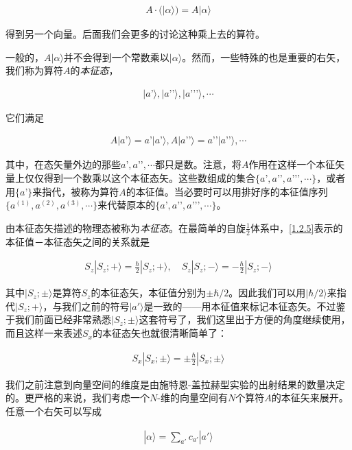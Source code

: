 \documentclass[UTF8,twoside]{ctexart}
\begin{document}
\begin{align}
A\cdot(|\alpha\rangle) = A|\alpha\rangle
\end{align}

\noindent 得到另一个向量。后面我们会更多的讨论这种乘上去的算符。

一般的，$A|\alpha\rangle$并不会得到一个常数乘以$|\alpha\rangle$。然而，一些特殊的也是重要的右矢，我们称为算符$A$的{\emph{本征态}}，

\begin{align}
|a’\rangle,|a’’\rangle,|a’’’\rangle,\cdots
\end{align}

\noindent 它们满足

\begin{align}\label{1.2.5}
A|a’\rangle = a’|a’\rangle,A|a’’\rangle = a’’|a’’\rangle,\cdots
\end{align}

其中，在态矢量外边的那些$a’, a’’,\cdots$都只是数。注意，将$A$作用在这样一个本征矢量上仅仅得到一个数乘以这个本征态矢。这些数组成的集合$\{a’,a’’,a’’’,\cdots\}$，或者用$\{a’\}$来指代，被称为算符$A$的本征值。当必要时可以用排好序的本征值序列$\{a^{(1)},a^{(2)},a^{(3)},\cdots\}$来代替原本的$\{a’,a’’,a’’’,\cdots\}$。

由本征态矢描述的物理态被称为{\emph{本征态}}。在最简单的自旋$\frac{1}{2}$体系中，\eqref{1.2.5}表示的本征值－本征态矢之间的关系就是

\begin{align}
S_z|S_z;+\rangle = \frac{\hbar}{2}|S_z;+\rangle,\quad S_z|S_z;-\rangle = -\frac{\hbar}{2}|S_z;-\rangle
\end{align}

其中$|S_z;\pm\rangle$是算符$S_z$的本征态矢，本征值分别为$\pm\hbar/2$。因此我们可以用$|\hbar/2\rangle$来指代$|S_z;+\rangle$，与我们之前的符号$|a'\rangle$是一致的——用本征值来标记本征态矢。不过鉴于我们前面已经非常熟悉$|S_z;\pm\rangle$这套符号了，我们这里出于方便的角度继续使用，而且这样一来表述$S_x$的本征态矢也就很清晰简单了：

\begin{align}
S_x|S_x;\pm\rangle = \pm\frac{\hbar}{2}|S_x;\pm\rangle
\end{align}

我们之前注意到向量空间的维度是由施特恩-盖拉赫型实验的出射结果的数量决定的。更严格的来说，我们考虑一个$N$-维的向量空间有$N$个算符$A$的本征矢来展开。任意一个右矢可以写成

\begin{align}
|\alpha\rangle = \sum_{a'}c_{a'}|a'\rangle
\end{align}
\end{document}
